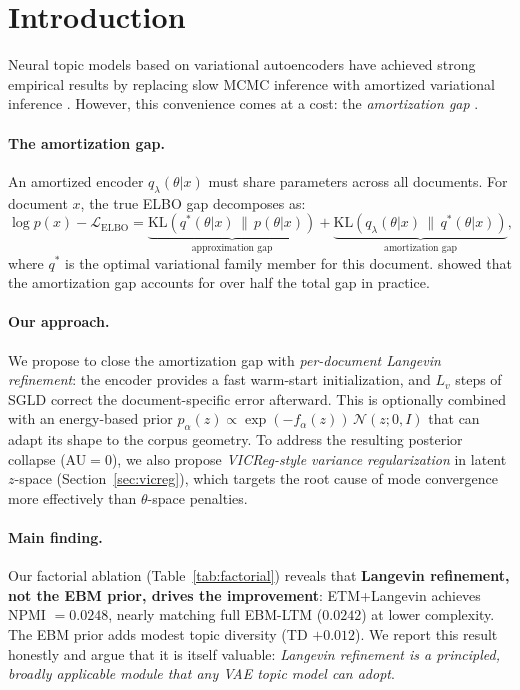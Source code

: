 \documentclass[10pt]{article}
\newcommand{\KL}{\mathrm{KL}}
\begin{document}
\section{Introduction}
\label{sec:intro}

Neural topic models based on variational autoencoders \citep{kingma2014vae} have achieved
strong empirical results by replacing slow MCMC inference with amortized variational
inference \citep{srivastava2017,dieng2020,card2018,wu2023}.
However, this convenience comes at a cost: the \emph{amortization gap}
\citep{cremer2018}.

\paragraph{The amortization gap.}
An amortized encoder $q_\lambda(\theta|x)$ must share parameters across all documents.
For document $x$, the true ELBO gap decomposes as:
\begin{equation}
    \log p(x) - \mathcal{L}_{\mathrm{ELBO}}
    = \underbrace{\KL(q^*(\theta|x)\,\|\,p(\theta|x))}_{\text{approximation gap}}
    + \underbrace{\KL(q_\lambda(\theta|x)\,\|\,q^*(\theta|x))}_{\text{amortization gap}},
\end{equation}
where $q^*$ is the optimal variational family member for this document.
\citet{cremer2018} showed that the amortization gap accounts for over half the total
gap in practice.

\paragraph{Our approach.}
We propose to close the amortization gap with \emph{per-document Langevin refinement}:
the encoder provides a fast warm-start initialization, and $L_v$ steps of SGLD
correct the document-specific error afterward.
This is optionally combined with an energy-based prior $p_\alpha(z) \propto \exp(-f_\alpha(z))\,\mathcal{N}(z;0,I)$
that can adapt its shape to the corpus geometry.
To address the resulting posterior collapse (AU$=0$), we also propose \emph{VICReg-style
variance regularization} in latent $z$-space (Section~\ref{sec:vicreg}), which targets
the root cause of mode convergence more effectively than $\theta$-space penalties.

\paragraph{Main finding.}
Our factorial ablation (Table~\ref{tab:factorial}) reveals that \textbf{Langevin
refinement, not the EBM prior, drives the improvement}: ETM+Langevin achieves
NPMI $= 0.0248$, nearly matching full EBM-LTM ($0.0242$) at lower complexity.
The EBM prior adds modest topic diversity (TD $+0.012$). We report this result
honestly and argue that it is itself valuable: \emph{Langevin refinement is a
principled, broadly applicable module that any VAE topic model can adopt}.
\end{document}
